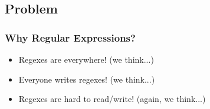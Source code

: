 
\subsection{Problem}
\begin{frame}
\frametitle{Why Regular Expressions?}

\begin{itemize}
\item Regexes are everywhere! (we think...)
\item<2-> Everyone writes regexes! (we think...)
\item<3-> Regexes are hard to read/write! (again, we think...)
\end{itemize}
%
%
%
%

\end{frame}



